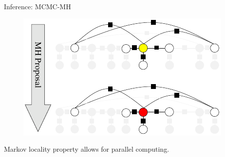 \documentclass[onlymath,xcolor=pdftex,dvipsnames,table]{beamer}
\newcommand{\head}[1]{{\large\color{OliveGreen}#1\\[2pt]}}
\begin{document}
\begin{frame}{Inference: MCMC-MH}
\begin{figure}
  \centering
  \includegraphics[width=.5\textwidth]{mcmc.pdf}
\end{figure}
Markov locality property allows for parallel computing.
\end{frame}






\end{document}
